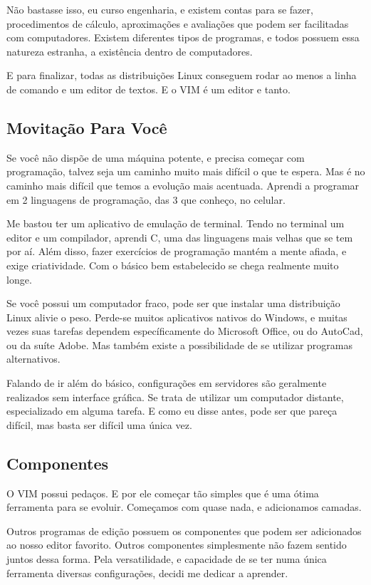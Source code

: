 \documentclass[a4paper, 12pt]{article}
\begin{document}
Não bastasse isso, eu curso engenharia, e existem contas para se fazer, procedimentos de cálculo, aproximações e avaliações que podem ser facilitadas com computadores.
Existem diferentes tipos de programas, e todos possuem essa natureza estranha, a existência dentro de computadores.

E para finalizar, todas as distribuições Linux conseguem rodar ao menos a linha de comando e um editor de textos.
E o VIM é um editor e tanto.

\subsection{Movitação Para Você}
Se você não dispõe de uma máquina potente, e precisa começar com programação, talvez seja um caminho muito mais difícil o que te espera.
Mas é no caminho mais difícil que temos a evolução mais acentuada.
Aprendi a programar em 2 linguagens de programação, das 3 que conheço, no celular.

Me bastou ter um aplicativo de emulação de terminal.
Tendo no terminal um editor e um compilador, aprendi C, uma das linguagens mais velhas que se tem por aí.
Além disso, fazer exercícios de programação mantém a mente afiada, e exige criatividade.
Com o básico bem estabelecido se chega realmente muito longe.

Se você possui um computador fraco, pode ser que instalar uma distribuição Linux alivie o peso.
Perde-se muitos aplicativos nativos do Windows, e muitas vezes suas tarefas dependem específicamente do Microsoft Office, ou do AutoCad, ou da suíte Adobe.
Mas também existe a possibilidade de se utilizar programas alternativos.

Falando de ir além do básico, configurações em servidores são geralmente realizados sem interface gráfica.
Se trata de utilizar um computador distante, especializado em alguma tarefa.
E como eu disse antes, pode ser que pareça difícil, mas basta ser difícil uma única vez.

\subsection{Componentes}
O VIM possui pedaços.
E por ele começar tão simples que é uma ótima ferramenta para se evoluir.
Começamos com quase nada, e adicionamos camadas.

Outros programas de edição possuem os componentes que podem ser adicionados ao nosso editor favorito.
Outros componentes simplesmente não fazem sentido juntos dessa forma.
Pela versatilidade, e capacidade de se ter numa única ferramenta diversas configurações, decidi me dedicar a aprender.
\end{document}
